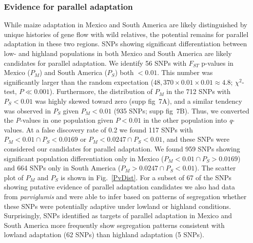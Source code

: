 {{\subsubsection{Evidence for parallel adaptation}

While maize adaptation in Mexico and South America are likely distinguished by unique histories of gene flow with wild relatives, the potential remains for parallel adaptation in these two regions.  
SNPs showing significant differentiation between low- and highland populations in both Mexico and South America are likely candidates for parallel adaptation. 
We identify 56 SNPs with $F_{ST}$ p-values in Mexico ($P_M$) and South America ($P_S$) both $<0.01$.   
This number  was significantly larger than the random expectation ($48,370\times 0.01 \times 0.01 \approx 4.8$; $\chi^2$-test, $P\ll0.001$).  Furthermore, the distribution of $P_M$ in the 712 SNPs with $P_S<0.01$ was highly skewed toward zero (supp fig~7A), and a similar tendency was observed in $P_S$ given $P_M<0.01$ (935 SNPs; supp fig~7B).  Thus, we converted the \emph{P}-values in one population given $P<0.01$ in the other population into \emph{q}-values.  
At a false discovery rate of 0.2 we found 117 SNPs with $P_M<0.01 \cap P_S < 0.0169$ or $P_M<0.0247 \cap P_S < 0.01$, and these SNPs were considered our candidates for parallel adaptation.
We found 959 SNPs showing significant population differentiation only in Mexico ($P_M<0.01 \cap P_S > 0.0169$) and 664 SNPs only in South America  ($P_M>0.0247 \cap P_S < 0.01$).  The scatter plot of $P_M$ and $P_S$ is shown in Fig.~\ref{PvDist}.  
For a subset of 67 of the SNPs showing putative evidence of parallel adaptation candidates we also had data from \emph{parviglumis} and were able to infer based on patterns of segregation whether these SNPs were potentially adaptive under lowland or highland conditions.  Surprisingly, SNPs identified as targets of parallel adaptation in Mexico and South America more frequently show segregation patterns consistent with lowland adaptation (62 SNPs) than highland adaptation (5 SNPs). %
%
%
}}
